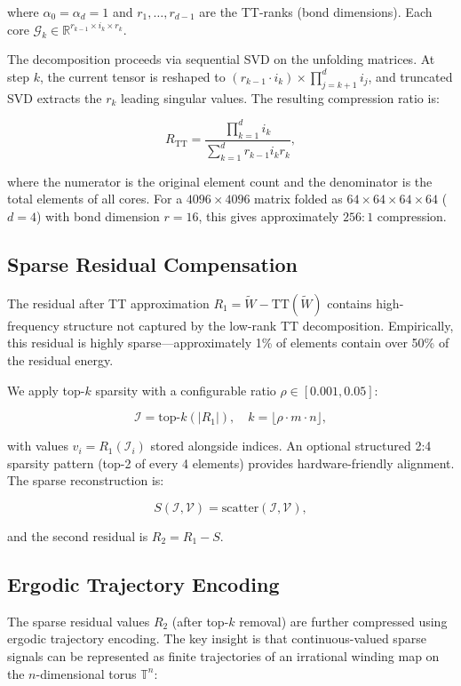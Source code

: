 \documentclass[11pt,a4paper]{article}
\begin{document}
where $\alpha_0 = \alpha_d = 1$ and $r_1, \dots, r_{d-1}$ are the TT-ranks (bond
dimensions). Each core $\mathcal{G}_k \in \mathbb{R}^{r_{k-1} \times i_k \times r_k}$.

The decomposition proceeds via sequential SVD on the unfolding matrices. At step $k$,
the current tensor is reshaped to $(r_{k-1} \cdot i_k) \times \prod_{j=k+1}^d i_j$,
and truncated SVD extracts the $r_k$ leading singular values. The resulting
compression ratio is:

\[
	R_{\text{TT}} = \frac{\prod_{k=1}^d i_k}{\sum_{k=1}^d r_{k-1} i_k r_k},
\]

where the numerator is the original element count and the denominator is the total
elements of all cores. For a $4096 \times 4096$ matrix folded as $64 \times 64 \times 64 \times 64$
($d=4$) with bond dimension $r = 16$, this gives approximately $256:1$ compression.

\subsection{Sparse Residual Compensation}

The residual after TT approximation $R_1 = \tilde{W} - \text{TT}(\tilde{W})$ contains
high-frequency structure not captured by the low-rank TT decomposition. Empirically,
this residual is highly sparse---approximately 1\% of elements contain over 50\% of
the residual energy.

We apply top-$k$ sparsity with a configurable ratio $\rho \in [0.001, 0.05]$:

\[
	\mathcal{I} = \text{top-}k(|R_1|), \quad k = \lfloor \rho \cdot m \cdot n \rfloor,
\]

with values $v_i = R_1(\mathcal{I}_i)$ stored alongside indices. An optional
structured 2:4 sparsity pattern (top-2 of every 4 elements) provides hardware-friendly
alignment. The sparse reconstruction is:

\[
	S(\mathcal{I}, \mathcal{V}) = \text{scatter}(\mathcal{I}, \mathcal{V}),
\]

and the second residual is $R_2 = R_1 - S$.

\subsection{Ergodic Trajectory Encoding}

The sparse residual values $R_2$ (after top-$k$ removal) are further compressed using
ergodic trajectory encoding. The key insight is that continuous-valued sparse signals
can be represented as finite trajectories of an irrational winding map on the
$n$-dimensional torus $\mathbb{T}^n$:
\end{document}
